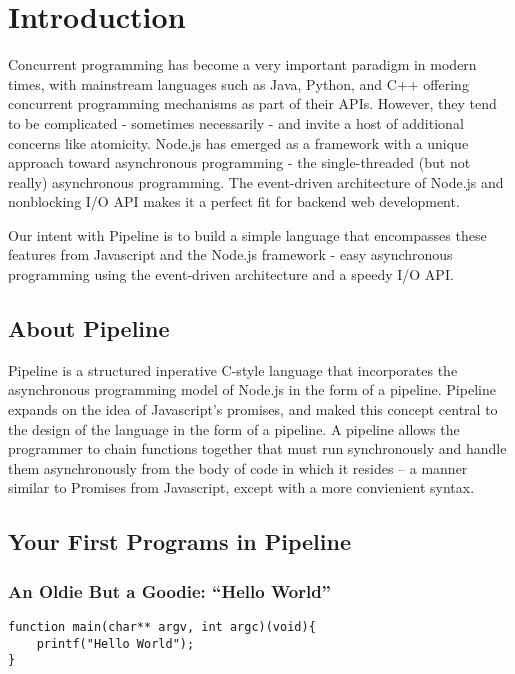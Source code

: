 \documentclass[./LRM_main.tex]{subfiles}
\begin{document}


\chapter{Introduction}
Concurrent programming has become a very important paradigm in 
modern times, with mainstream languages such as Java, Python, and C++ offering 
concurrent programming mechanisms as part of their APIs. However, they tend to 
be complicated - sometimes necessarily - and invite a host of additional 
concerns like atomicity. Node.js has emerged as a framework with a unique approach toward asynchronous 
programming - the single-threaded (but not really) asynchronous programming. 
The event-driven architecture of Node.js and nonblocking I/O API makes it a 
perfect fit for backend web development.

Our intent with Pipeline is to build a simple language that encompasses these features from 
Javascript and the Node.js framework - easy asynchronous programming using the 
event-driven architecture and a speedy I/O API.

\section{About Pipeline}
Pipeline is a structured inperative C-style language that incorporates the asynchronous programming model of Node.js in the form of a pipeline. Pipeline expands on the idea of Javascript's promises, and maked this concept central to the design of the language in the form of a pipeline. A pipeline allows the programmer to chain functions together that must run synchronously and handle them asynchronously from the body of code in which it resides -- a manner similar to Promises from Javascript, except with a more convienient syntax. 

\section{Your First Programs in Pipeline}
\subsection{An Oldie But a Goodie: “Hello World”}
\begin{lstlisting}
function main(char** argv, int argc)(void){
	printf("Hello World");
}
\end{lstlisting}
\end{document}
